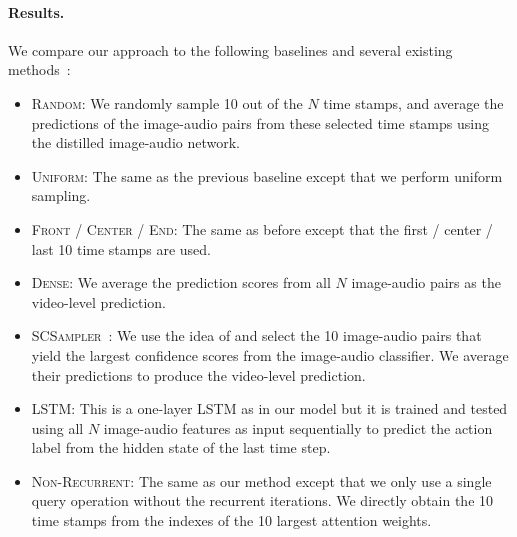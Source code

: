 \paragraph{Results.} We compare our approach to the following baselines and several existing methods~\cite{yeung2016end,fan2018watching,wu2019adaframe,wu2019multiagent,korbar2019scsampler}:
\vspace{-0.05in}
\begin{itemize}[leftmargin=4mm]
\itemsep0em
\item \textsc{Random:} We randomly sample 10 out of the $N$ time stamps, and average the predictions of the image-audio pairs from these selected time stamps using the distilled image-audio network.
\vspace{-0.05in}
\item \textsc{Uniform:} The same as the previous baseline except that we perform uniform sampling.
\vspace{-0.05in}
\item \textsc{Front / Center / End:} The same as before except that the first / center / last 10 time stamps are used.
\vspace{-0.05in}
\item \textsc{Dense:} We average the prediction scores from all $N$ image-audio pairs as the video-level prediction.
\vspace{-0.05in}
\item \textsc{SCSampler~\cite{korbar2019scsampler}:} We use the idea of \cite{korbar2019scsampler} and select the 10 image-audio pairs that yield the largest confidence scores from the image-audio classifier. We average their predictions to produce the video-level prediction. 
\vspace{-0.05in}
\item \textsc{LSTM}: This is a one-layer LSTM as in our model but it is trained and tested using all $N$ image-audio features as input sequentially to predict the action label from the hidden state of the last time step.
\vspace{-0.05in}
\item \textsc{Non-Recurrent}: The same as our method except that we only use a single query operation without the recurrent iterations. We directly obtain the 10 time stamps from the indexes of the 10 largest attention weights.
\vspace{-0.05in}
\end{itemize}

